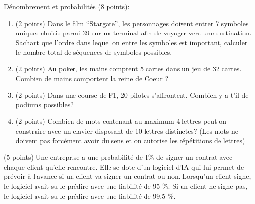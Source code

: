 \documentclass[a4paper]{article}
\newif\ifcorrection
\begin{document}
\exost D\'enombrement et probabilit\'es (8 points):
\begin{enumerate}
 \item (2 points) Dans le film ``Stargate'', les personnages doivent entrer 7 symboles uniques choisis parmi 39 sur un terminal afin de voyager vers une destination.
 Sachant que l'ordre dans lequel on entre les symboles est important, calculer le nombre total de s\'equences de symboles possibles.
    \ifcorrection
 \textcolor{red}{(tirage ordonn\'e sans remise) Il existe donc $A_{39}^7 = \frac{39!}{32!} = \prod_{x = 33}^{39} x = 77~519~922~480$ adresses}
 \fi
 \item (2 points) Au poker, les mains comptent 5 cartes dans un jeu de 32 cartes. Combien de mains comportent la reine de Coeur ? 
    \ifcorrection
 \textcolor{red}{(tirage non-ordonn\'e sans remise) La reine de coeur est fixe, pour le reste, il y a $C_{31}^4 = \frac{31!}{27!4!}=31~465 $ mains. On peut \'eventuellement tol\'erer
 la solution tenant compte de l'ordre m\^eme si ce n'est pas la plus \'evidente pour une ``main'' dans un jeu de cartes. $A_{31}^4 = C_{31}^4 4! = 755~160$}
 \fi
 \item (2 points) Dans une course de F1, 20 pilotes s'affrontent. Combien y a t'il de podiums possibles? 
    \ifcorrection
  \textcolor{red}{Il s'agit d'un tirage ordonn\'e sans remise. Il y a donc $A_{20}^3=\dfrac{20!}{17!}=6840$ podiums possibles.}
  \fi
 \item (2 points) Combien de mots contenant au maximum 4 lettres peut-on construire avec un clavier disposant de 10 lettres distinctes? (Les mots ne doivent pas 
 forc\'ement avoir du sens et on autorise les r\'ep\'etitions de lettres)
 \ifcorrection
  \textcolor{red}{Il s'agit d'une sucession de tirages ordonn\'es avec remise de $k \in {1,2,3,4}$ parmi $n=10$, soit $\sum_{k=1}^4 n^k = 10 + 10^2 + 10^3 + 10^4 = 11 110$}
  \fi
\end{enumerate}

\exost (5 points) Une entreprise a une probabilit\'e de 1\% de signer un contrat avec chaque client
qu'elle rencontre.
Elle se dote d'un logiciel d'IA qui lui permet de pr\'evoir \`a l'avance si un client va signer un contrat ou
non. 
Lorsqu'un client signe, le logiciel avait su le pr\'edire avec une fiabilit\'e de 95 \%.
Si un client ne signe pas, le logiciel avait su le pr\'edire avec une fiabilit\'e de 99,5 \%.
\end{document}
